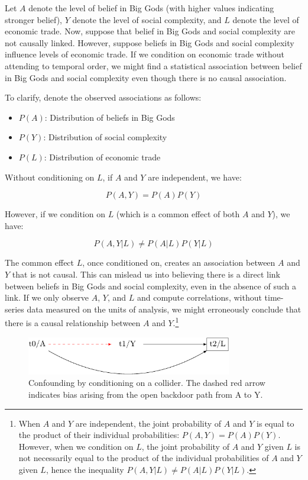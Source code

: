 \documentclass[
  singlecolumn]{report}
\providecommand{\tightlist}{%
  \setlength{\itemsep}{0pt}\setlength{\parskip}{0pt}}\usepackage{longtable,booktabs,array}
\begin{document}
Let \(A\) denote the level of belief in Big Gods (with higher values
indicating stronger belief), \(Y\) denote the level of social
complexity, and \(L\) denote the level of economic trade. Now, suppose
that belief in Big Gods and social complexity are not causally linked.
However, suppose beliefs in Big Gods and social complexity influence
levels of economic trade. If we condition on economic trade without
attending to temporal order, we might find a statistical association
between belief in Big Gods and social complexity even though there is no
causal association.

To clarify, denote the observed associations as follows:

\begin{itemize}
\tightlist
\item
  \(P(A)\): Distribution of beliefs in Big Gods
\item
  \(P(Y)\): Distribution of social complexity
\item
  \(P(L)\): Distribution of economic trade
\end{itemize}

Without conditioning on \(L\), if \(A\) and \(Y\) are independent, we
have:

\[P(A, Y) = P(A)P(Y)\]

However, if we condition on \(L\) (which is a common effect of both
\(A\) and \(Y\)), we have:

\[P(A, Y | L) \neq P(A | L)P(Y | L)\]

The common effect \(L\), once conditioned on, creates an association
between \(A\) and \(Y\) that is not causal. This can mislead us into
believing there is a direct link between beliefs in Big Gods and social
complexity, even in the absence of such a link. If we only observe
\(A\), \(Y\), and \(L\) and compute correlations, without time-series
data measured on the units of analysis, we might erroneously conclude
that there is a causal relationship between \(A\) and \(Y\).\footnote{When
  \(A\) and \(Y\) are independent, the joint probability of \(A\) and
  \(Y\) is equal to the product of their individual probabilities:
  \(P(A, Y) = P(A)P(Y)\). However, when we condition on \(L\), the joint
  probability of \(A\) and \(Y\) given \(L\) is not necessarily equal to
  the product of the individual probabilities of \(A\) and \(Y\) given
  \(L\), hence the inequality \(P(A, Y | L) \neq P(A | L)P(Y | L)\).}

\begin{figure}

{\centering \includegraphics[width=0.8\textwidth,height=\textheight]{causal-dags_files/figure-pdf/fig-dag-common-effect-1.pdf}

}

\caption{\label{fig-dag-common-effect}Confounding by conditioning on a
collider. The dashed red arrow indicates bias arising from the open
backdoor path from A to Y.}

\end{figure}
\end{document}
